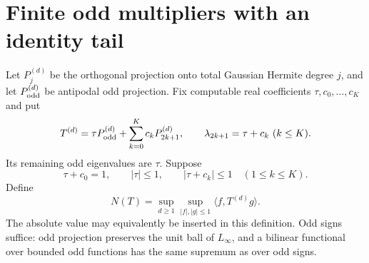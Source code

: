 \section{Finite odd multipliers with an identity tail}
Let $P_j^{(d)}$ be the orthogonal projection onto total Gaussian Hermite
degree $j$, and let $P_{\rm odd}^{(d)}$ be antipodal odd projection.
Fix computable real coefficients $\tau,c_0,\ldots,c_K$ and put
\[
 T^{(d)}=\tau P_{\rm odd}^{(d)}+
                 \sum_{k=0}^Kc_kP_{2k+1}^{(d)},\qquad
 \lambda_{2k+1}=\tau+c_k\ (k\leq K).
\]
Its remaining odd eigenvalues are $\tau$.  Suppose
\begin{equation}\label{eq:new-odd-spectral-cube}
 \tau+c_0=1,\qquad |\tau|\leq1,\qquad
                    |\tau+c_k|\leq1\quad(1\leq k\leq K).
\end{equation}
Define
\[
 N(T)=\sup_{d\geq1}\sup_{|f|,|g|\leq1}
             \langle f,T^{(d)}g\rangle.
\]
The absolute value may equivalently be inserted in this definition.
Odd signs suffice: odd projection preserves the unit ball of $L_\infty$,
and a bilinear functional over bounded odd functions has the same
supremum as over odd signs.

